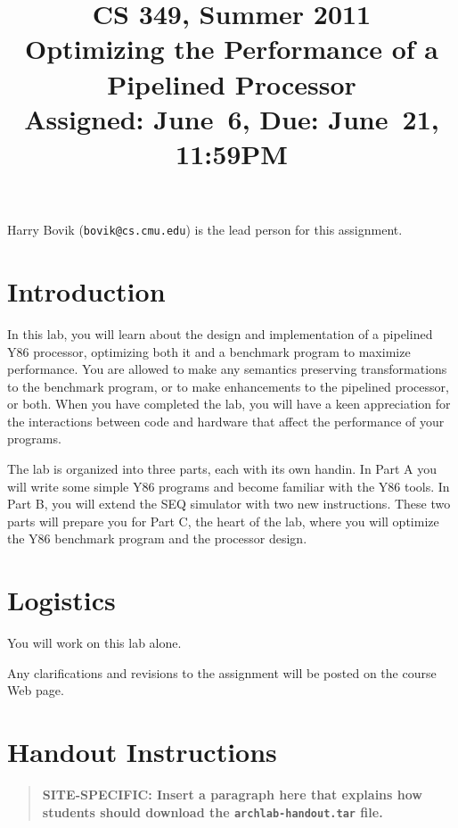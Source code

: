 \documentclass[11pt]{article}
\begin{document}
\title{CS 349, Summer 2011\\
Optimizing the Performance of a Pipelined Processor\\
Assigned: June~6, Due: June~21, 11:59PM}

\author{}
\date{}

\maketitle

Harry Bovik ({\tt bovik@cs.cmu.edu}) is the lead person for this
assignment.

\section{Introduction}

In this lab, you will learn about the design and implementation of a
pipelined Y86 processor, optimizing both it and a benchmark
program to maximize performance.
You are allowed to make any semantics preserving
transformations to the benchmark program, or to make enhancements to
the pipelined processor, or both. When you have completed the lab, you
will have a keen appreciation for the interactions between code and
hardware that affect the performance of your programs.

The lab is organized into three parts, each with its own handin.  In
Part A you will write some simple Y86 programs and become familiar
with the Y86 tools. In Part B, you will extend the SEQ simulator with
two new instructions. These two parts will prepare you for Part C, the
heart of the lab, where you will optimize the Y86 benchmark program and
the processor design.

\section{Logistics}

You will work on this lab alone.  

Any clarifications and revisions to the assignment will be posted on
the course Web page.

\section{Handout Instructions}

\begin{quote}
\bf SITE-SPECIFIC: Insert a paragraph here that explains how students
should download the \texttt{archlab-handout.tar} file.
\end{quote}
\end{document}
